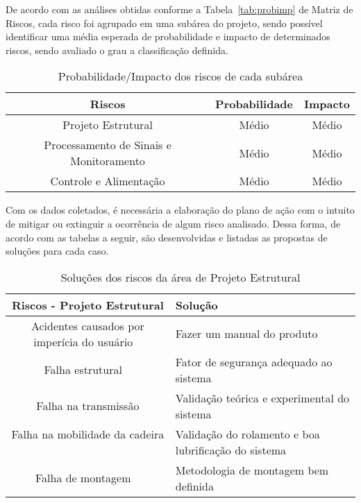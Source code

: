 De acordo com as análises obtidas conforme a Tabela~\ref{tab:probimp} de Matriz de Riscos,
cada risco foi agrupado em uma subárea do projeto, sendo possível identificar uma
média esperada de probabilidade e impacto de determinados riscos, sendo avaliado o
grau a classificação definida.

\begin{table}[h]
\centering
\vspace{0.5cm}
\begin{tabular}{|c|c|c|}
\hline
Riscos                    & Probabilidade & Impacto \\
\hline
Projeto Estrutural                 & Médio         & Médio \\
Processamento de Sinais e Monitoramento  & Médio         & Médio \\
Controle e Alimentação               & Médio         & Médio \\
\hline
\end{tabular}
\caption{Probabilidade/Impacto dos riscos de cada subárea}
\label{tab:probimparea}
\end{table}

Com os dados coletados, é necessária a elaboração do plano de ação com o
intuito de mitigar ou extinguir a ocorrência de algum risco analisado. Dessa forma, de
acordo com as tabelas a seguir, são desenvolvidas e listadas as propostas de soluções
para cada caso.

\begin{table}[h]
\centering
\vspace{0.5cm}
\begin{tabular}{|c|p{8cm}|}
\hline
Riscos - Projeto Estrutural                                     & Solução \\
\hline
Acidentes causados por imperícia do usuário            & Fazer um manual do produto \\
Falha estrutural                                       & Fator de segurança adequado ao sistema \\
Falha na transmissão                                   & Validação teórica e experimental do sistema \\
Falha na mobilidade da cadeira                         & Validação do rolamento e boa lubrificação do sistema \\
Falha de montagem                                      & Metodologia de montagem bem definida \\
\hline
\end{tabular}
\caption{Soluções dos riscos da área de Projeto Estrutural}
\label{tab:riscosubareaest}
\end{table}

